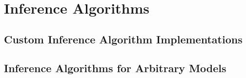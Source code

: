 \section{Inference Algorithms}

\subsection{Custom Inference Algorithm Implementations}

\subsection{Inference Algorithms for Arbitrary Models}